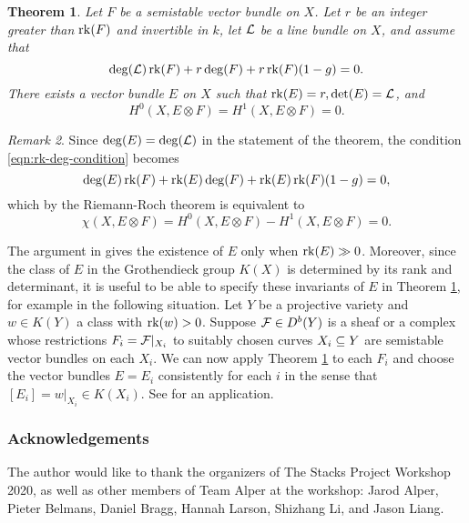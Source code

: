 \documentclass[letterpaper,12pt]{amsart}
\newtheorem{thm}{Theorem}[section]
\theoremstyle{remark}
\newtheorem{rmk}[thm]{Remark}
\begin{document}
\begin{thm}\label{mainlemma1}
    Let $F$ be a semistable vector bundle on $X$. Let $r$ be an integer greater than $\operatorname{\mathrm{rk}}(F)$ and invertible in $k$, let $\mathcal{L}$ be a line bundle on $X$, and assume that
    \begin{equation}\label{eqn:rk-deg-condition}
        \deg(\mathcal{L}) \operatorname{\mathrm{rk}}(F) + r \deg(F) + r \operatorname{\mathrm{rk}}(F) (1-g) = 0.
    \end{equation}
    There exists a vector bundle $E$ on $X$ such that $\operatorname{\mathrm{rk}}(E) = r, \det(E) = \mathcal{L}$, and 
    \[ H^0(X, E \otimes F) = H^1(X, E \otimes F) = 0. \]
\end{thm}
\begin{rmk}
    Since $\deg(E) = \deg(\mathcal{L})$ in the statement of the theorem, the condition \eqref{eqn:rk-deg-condition} becomes
    \[ \deg(E) \operatorname{\mathrm{rk}}(F) + \operatorname{\mathrm{rk}}(E) \deg(F) + \operatorname{\mathrm{rk}}(E) \operatorname{\mathrm{rk}}(F) (1-g) = 0, \]
    which by the Riemann-Roch theorem is equivalent to
    \[ \chi(X, E \otimes F) = H^0(X, E \otimes F) - H^1(X, E \otimes F) = 0. \]
\end{rmk}

The argument in \cite{seshadri} gives the existence of $E$ only when $\operatorname{\mathrm{rk}}(E) \gg 0$. Moreover, since the class of $E$ in the Grothendieck group $K(X)$ is determined by its rank and determinant, it is useful to be able to specify these invariants of $E$ in Theorem \ref{mainlemma1}, for example in the following situation. Let $Y$ be a projective variety and $w \in K(Y)$ a class with $\operatorname{\mathrm{rk}}(w) > 0$. Suppose $\mathcal{F} \in D^b(Y)$ is a sheaf or a complex whose restrictions $F_i = \mathcal{F}|_{X_i}$ to suitably chosen curves $X_i \subseteq Y$ are semistable vector bundles on each $X_i$. We can now apply Theorem \ref{mainlemma1} to each $F_i$ and choose the vector bundles $E = E_i$ consistently for each $i$ in the sense that $[E_i] = w|_{X_i} \in K(X_i)$. See \cite[Proposition 6.8]{t} for an application.

\subsubsection*{Acknowledgements} The author would like to thank the organizers of The Stacks Project Workshop 2020, as well as other members of Team Alper at the workshop: Jarod Alper, Pieter Belmans, Daniel Bragg, Hannah Larson, Shizhang Li, and Jason Liang.
\end{document}
